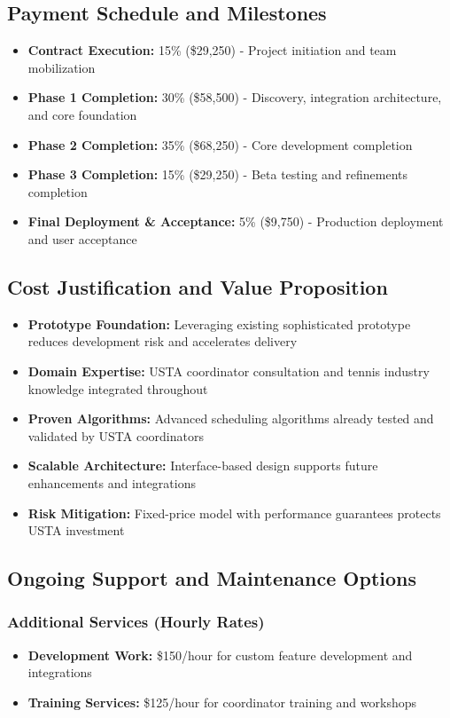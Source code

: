 \subsection{Payment Schedule and Milestones}
\begin{itemize}
    \item \textbf{Contract Execution:} 15\% (\$29,250) - Project initiation and team mobilization
    \item \textbf{Phase 1 Completion:} 30\% (\$58,500) - Discovery, integration architecture, and core foundation
    \item \textbf{Phase 2 Completion:} 35\% (\$68,250) - Core development completion
    \item \textbf{Phase 3 Completion:} 15\% (\$29,250) - Beta testing and refinements completion
    \item \textbf{Final Deployment \& Acceptance:} 5\% (\$9,750) - Production deployment and user acceptance
\end{itemize}

\subsection{Cost Justification and Value Proposition}
\begin{itemize}
    \item \textbf{Prototype Foundation:} Leveraging existing sophisticated prototype reduces development risk and accelerates delivery
    \item \textbf{Domain Expertise:} USTA coordinator consultation and tennis industry knowledge integrated throughout
    \item \textbf{Proven Algorithms:} Advanced scheduling algorithms already tested and validated by USTA coordinators
    \item \textbf{Scalable Architecture:} Interface-based design supports future enhancements and integrations
    \item \textbf{Risk Mitigation:} Fixed-price model with performance guarantees protects USTA investment
\end{itemize}

\subsection{Ongoing Support and Maintenance Options}

\subsubsection{Additional Services (Hourly Rates)}
\begin{itemize}
    \item \textbf{Development Work:} \$150/hour for custom feature development and integrations
    \item \textbf{Training Services:} \$125/hour for coordinator training and workshops

\end{itemize}

